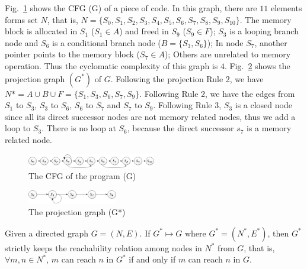 Fig.~\ref{fig:3} shows the CFG (G) of a piece of code. In this graph, there are $11$ elements forms set $N$, that is, $N = \{S_0, S_1, S_2, S_3, S_4, S_5, S_6, S_7, S_8, S_9, S_{10}\}$. The memory block is allocated in $S_1$ ($S_1\in A$) and freed in $S_9$ ($S_9\in F$); $S_3$ is a looping branch node and $S_6$ is a conditional branch node ($B=\{S_3, S_6\}$); In node $S_7$, another pointer points to the memory block ($S_7\in A$); Others are unrelated to memory operation. Thus the cyclomatic complexity of this graph is $4$.
Fig.~\ref{fig:4} shows the projection graph $(G^*)$ of $G$. Following the projection Rule 2, we have $N*=A\cup B\cup F=\{S_1, S_3, S_6, S_7, S_9\}$. Following Rule $2$, we have the edges from $S_1$ to $S_3$, $S_3$ to $S_6$, $S_6$ to $S_7$ and $S_7$ to $S_9$. Following Rule $3$, $S_3$ is a closed node since all its direct successor nodes are not memory related nodes, thus we add a loop to $S_3$. There is no loop at $S_6$, because the direct successor $s_7$ is a memory related node.  

\begin{figure}[!h]
\center
\includegraphics[width=0.5\textwidth]{figure/fig1-fig4/fig_3}
\caption{The CFG of the program (G)}
\label{fig:3}
\end{figure}

\begin{figure}[!h]
\center
\includegraphics[width=0.35\textwidth]{figure/fig1-fig4/fig_4}
\caption{The projection graph (G*)}
\label{fig:4}
\end{figure}

\begin{theorem}
Given a directed graph $G = (N, E)$. If $G^* \mapsto G$ where $G^*=(N^*, E^*)$, then $G^*$ strictly keeps the reachability relation among nodes in $N^*$ from $G$, that is, $\forall m,n\in N^*$, $m$ can reach $n$ in $G^*$ if and only if $m$ can reach $n$ in $G$.
\end{theorem}

